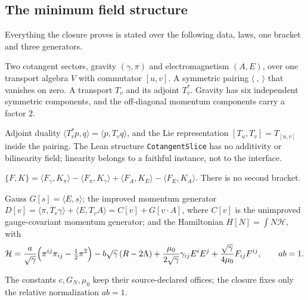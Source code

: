\documentclass[11pt,a4paper]{article}
\newcommand{\bs}[1]{\texttt{#1}}
\theoremstyle{plain}
\theoremstyle{definition}
\theoremstyle{remark}
\begin{document}
\subsection{The minimum field structure}
Everything the closure proves is stated over the following data, laws, one bracket and three generators.
\begin{description}[leftmargin=0pt,labelindent=0pt,font=\normalfont\bfseries,itemsep=3pt]
\item[Data.] Two cotangent sectors, gravity $(\gamma,\pi)$ and electromagnetism $(A,E)$, over one transport algebra $V$ with commutator $[u,v]$. A symmetric pairing $\langle\ ,\ \rangle$ that vanishes on zero. A transport $T_v$ and its adjoint $T_v^{*}$. Gravity has six independent symmetric components, and the off-diagonal momentum components carry a factor $2$.
\item[Two laws.] Adjoint duality $\langle T_v^{*}p,q\rangle=\langle p,T_vq\rangle$, and the Lie representation $[T_u,T_v]=T_{[u,v]}$ inside the pairing. The Lean structure \bs{CotangentSlice} has no additivity or bilinearity field; linearity belongs to a faithful instance, not to the interface.
\item[One bracket.] $\{F,K\}=\langle F_\gamma,K_\pi\rangle-\langle F_\pi,K_\gamma\rangle+\langle F_A,K_E\rangle-\langle F_E,K_A\rangle$. There is no second bracket.
\item[Three generators.] Gauss $G[s]=\langle E,s\rangle$; the improved momentum generator $D[v]=\langle\pi,T_v\gamma\rangle+\langle E,T_vA\rangle=C[v]+G[v\!\cdot\!A]$, where $C[v]$ is the unimproved gauge-covariant momentum generator; and the Hamiltonian $H[N]=\int N\mathcal H$, with
\[
\mathcal H=\frac{a}{\sqrt\gamma}\Bigl(\pi^{ij}\pi_{ij}-\tfrac12\pi^2\Bigr)-b\sqrt\gamma\,(R-2\Lambda)+\frac{\mu_0}{2\sqrt\gamma}\gamma_{ij}E^iE^j+\frac{\sqrt\gamma}{4\mu_0}F_{ij}F^{ij},\qquad ab=1.
\]
\end{description}
The constants $c,G_N,\mu_0$ keep their source-declared offices; the closure fixes only the relative normalization $ab=1$.
\end{document}
